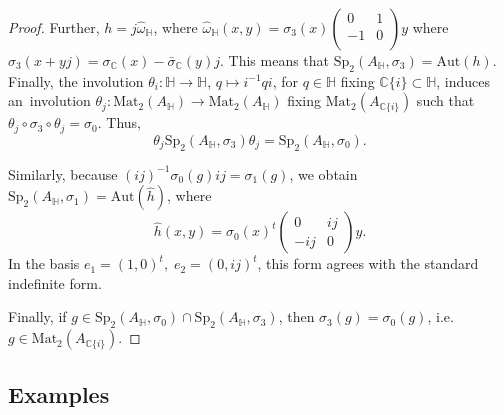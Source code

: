 \documentclass[oneside,11pt]{amsart}
\theoremstyle{definition}
\theoremstyle{remark}
\numberwithin{thm}{section}
\numberwithin{equation}{section}
\begin{document}
\begin{proof}
 \noindent Further, $h=j\hat\omega_\mathbb H$, where $\hat\omega_\mathbb H(x,y)=\sigma_3(x)\begin{pmatrix}
   0 & 1  \\
   -1 & 0  \\
\end{pmatrix} y$ where $\sigma_3(x+yj)={\sigma}_{\mathbb{C}}(x)-\bar{\sigma}_{\mathbb{C}}(y)j$. This means that $\mathrm{Sp}_2(A_\mathbb H,\sigma_3)=\mathrm{Aut}(h)$. Finally, the involution $\theta_i\colon \mathbb H\to\mathbb H$, $q\mapsto i^{-1}qi$, for $q\in\mathbb H$ fixing $\mathbb C\{i\}\subset\mathbb H$, induces an~involution $\theta_j\colon\mathrm{Mat}_2(A_\mathbb H)\to \mathrm{Mat}_2(A_\mathbb H)$ fixing $\mathrm{Mat}_2(A_{\mathbb C\{i\}})$ such that $\theta_j\circ\sigma_3\circ\theta_j=\sigma_0$. Thus, 
$$
\theta_j\mathrm{Sp}_2(A_\mathbb H,\sigma_3)\theta_j=\mathrm{Sp}_2(A_\mathbb H,\sigma_0).$$

\noindent  Similarly, because $(ij)^{-1}\sigma_0(g)ij=\sigma_1(g)$, we obtain $\mathrm{Sp}_2(A_\mathbb H,\sigma_1)=\mathrm{Aut}(\hat h)$, where 
$$\hat h(x,y)=\sigma_0(x)^t\begin{pmatrix}
    0 & ij \\
    -ij & 0
\end{pmatrix}y.$$
In the basis $e_1=(1,0)^t,\;e_2=(0,ij)^t$, this form agrees with the standard indefinite form.

 \noindent Finally, if $g\in \mathrm{Sp}_{2}(A_\mathbb H,\sigma_0)\cap \mathrm{Sp}_{2}(A_\mathbb H,\sigma_3)$, then $\sigma_3(g)=\sigma_0(g)$, i.e. $g\in\mathrm{Mat}_2(A_{\mathbb C\{i\}})$.

\end{proof}

\subsection{Examples}\label{sec:real_examples}
\end{document}
